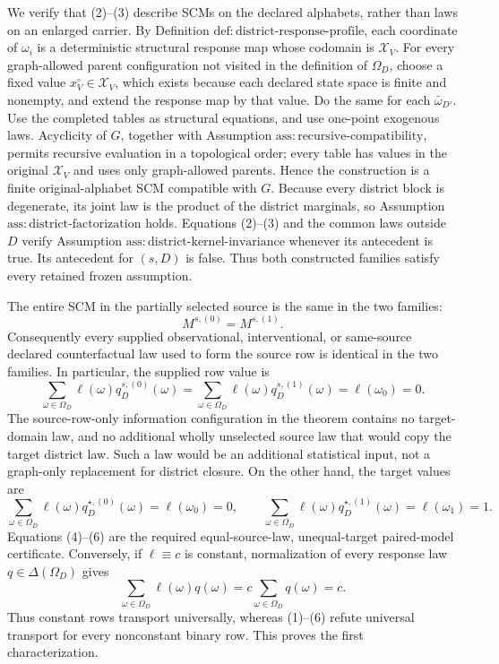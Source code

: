 We verify that (2)--(3) describe SCMs on the declared alphabets, rather than laws on an enlarged carrier.  By Definition \(\mathrm{def:district\text{-}response\text{-}profile}\), each coordinate of \(\omega_i\) is a deterministic structural response map whose codomain is \(\mathcal X_V\).  For every graph-allowed parent configuration not visited in the definition of \(\Omega_D\), choose a fixed value \(x_V^\circ\in\mathcal X_V\), which exists because each declared state space is finite and nonempty, and extend the response map by that value.  Do the same for each \(\bar\omega_{D'}\).  Use the completed tables as structural equations, and use one-point exogenous laws.  Acyclicity of \(G\), together with Assumption \(\mathrm{ass:recursive\text{-}compatibility}\), permits recursive evaluation in a topological order; every table has values in the original \(\mathcal X_V\) and uses only graph-allowed parents.  Hence the construction is a finite original-alphabet SCM compatible with \(G\).  Because every district block is degenerate, its joint law is the product of the district marginals, so Assumption \(\mathrm{ass:district\text{-}factorization}\) holds.  Equations (2)--(3) and the common laws outside \(D\) verify Assumption \(\mathrm{ass:district\text{-}kernel\text{-}invariance}\) whenever its antecedent is true.  Its antecedent for \((s,D)\) is false.  Thus both constructed families satisfy every retained frozen assumption.

The entire SCM in the partially selected source is the same in the two families:
\[
M^{s,(0)}=M^{s,(1)}.
\tag{4}
\]
Consequently every supplied observational, interventional, or same-source declared counterfactual law used to form the source row is identical in the two families.  In particular, the supplied row value is
\[
\sum_{\omega\in\Omega_D}\ell(\omega)q_D^{s,(0)}(\omega)
=
\sum_{\omega\in\Omega_D}\ell(\omega)q_D^{s,(1)}(\omega)
=\ell(\omega_0)=0.
\tag{5}
\]
The source-row-only information configuration in the theorem contains no target-domain law, and no additional wholly unselected source law that would copy the target district law.  Such a law would be an additional statistical input, not a graph-only replacement for district closure.  On the other hand, the target values are
\[
\sum_{\omega\in\Omega_D}\ell(\omega)q_D^{\star,(0)}(\omega)
=\ell(\omega_0)=0,
\qquad
\sum_{\omega\in\Omega_D}\ell(\omega)q_D^{\star,(1)}(\omega)
=\ell(\omega_1)=1.
\tag{6}
\]
Equations (4)--(6) are the required equal-source-law, unequal-target paired-model certificate.  Conversely, if \(\ell\equiv c\) is constant, normalization of every response law \(q\in\Delta(\Omega_D)\) gives
\[
\sum_{\omega\in\Omega_D}\ell(\omega)q(\omega)
=c\sum_{\omega\in\Omega_D}q(\omega)=c.
\tag{7}
\]
Thus constant rows transport universally, whereas (1)--(6) refute universal transport for every nonconstant binary row.  This proves the first characterization.

